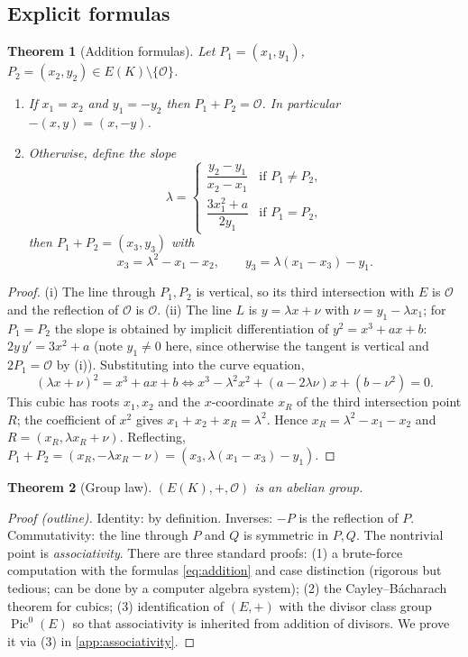 \documentclass[11pt,a4paper,oneside]{book}
\theoremstyle{plain}
\newtheorem{theorem}{Theorem}[chapter]
\theoremstyle{definition}
\theoremstyle{remark}
\newcommand{\Oinf}{\mathcal{O}}
\newcommand{\Pic}{\operatorname{Pic}}
\begin{document}
\subsection{Explicit formulas}

\begin{theorem}[Addition formulas]\label{thm:addition-formulas}
Let $P_1=(x_1,y_1)$, $P_2=(x_2,y_2)\in E(K)\setminus\{\Oinf\}$.
\begin{enumerate}[nosep,label=(\roman*)]
\item If $x_1=x_2$ and $y_1=-y_2$ then $P_1+P_2=\Oinf$. In particular $-(x,y)=(x,-y)$.
\item Otherwise, define the slope
\[
\lambda=\begin{cases}\dfrac{y_2-y_1}{x_2-x_1}&\text{if }P_1\neq P_2,\\[3mm]\dfrac{3x_1^2+a}{2y_1}&\text{if }P_1=P_2,\end{cases}
\]
then $P_1+P_2=(x_3,y_3)$ with
\begin{equation}\label{eq:addition}
x_3=\lambda^2-x_1-x_2,\qquad y_3=\lambda(x_1-x_3)-y_1 .
\end{equation}
\end{enumerate}
\end{theorem}
\begin{proof}
(i) The line through $P_1,P_2$ is vertical, so its third intersection with $E$ is $\Oinf$ and the reflection of $\Oinf$ is $\Oinf$.
(ii) The line $L$ is $y=\lambda x+\nu$ with $\nu=y_1-\lambda x_1$; for $P_1=P_2$ the slope is obtained by implicit differentiation of $y^2=x^3+ax+b$:
$2y\,y'=3x^2+a$ (note $y_1\neq 0$ here, since otherwise the tangent is vertical and $2P_1=\Oinf$ by (i)). Substituting into the curve equation,
\[
(\lambda x+\nu)^2=x^3+ax+b\iff x^3-\lambda^2x^2+(a-2\lambda\nu)x+(b-\nu^2)=0 .
\]
This cubic has roots $x_1,x_2$ and the $x$-coordinate $x_R$ of the third intersection point $R$; the coefficient of $x^2$ gives $x_1+x_2+x_R=\lambda^2$. Hence $x_R=\lambda^2-x_1-x_2$ and $R=(x_R,\lambda x_R+\nu)$. Reflecting, $P_1+P_2=(x_R,-\lambda x_R-\nu)=(x_3,\lambda(x_1-x_3)-y_1)$.
\end{proof}

\begin{theorem}[Group law]\label{thm:grouplaw}
$(E(K),+,\Oinf)$ is an abelian group.
\end{theorem}
\begin{proof}[Proof (outline)]
Identity: by definition. Inverses: $-P$ is the reflection of $P$. Commutativity: the line through $P$ and $Q$ is symmetric in $P,Q$. The nontrivial point is \emph{associativity}.
There are three standard proofs: (1) a brute-force computation with the formulas \eqref{eq:addition} and case distinction (rigorous but tedious; can be done by a computer algebra system);
(2) the Cayley--B\'acharach theorem for cubics; (3) identification of $(E,+)$ with the divisor class group $\Pic^0(E)$ so that associativity is inherited from addition of divisors.
We prove it via (3) in \cref{app:associativity}.
\end{proof}
\end{document}
